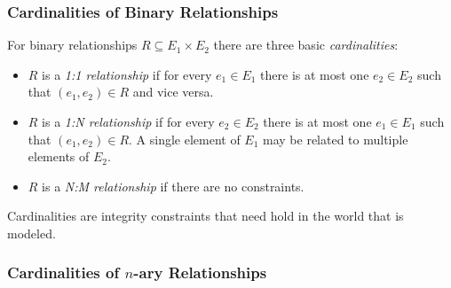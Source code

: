 



\subsubsection{Cardinalities of Binary Relationships}

For binary relationships $R \subseteq E_1 \times E_2$ there are three basic \emph{cardinalities}:

\begin{itemize}
\item $R$ is a \emph{1:1 relationship} if for every $e_1 \in E_1$ there is at most one $e_2 \in E_2$ such that $(e_1,e_2) \in R$ and vice versa.
\item $R$ is a \emph{1:N relationship} if for every $e_2 \in E_2$ there is at most one $e_1 \in E_1$ such that $(e_1,e_2) \in R$. A single element of $E_1$ may be related to multiple elements of $E_2$.
\item $R$ is a \emph{N:M relationship} if there are no constraints.
\end{itemize}

\begin{note}
Cardinalities are integrity constraints that need hold in the world that is modeled.
\end{note}




\subsubsection[Cardinalities of n-ary Relationships]{Cardinalities of $n$-ary Relationships}

